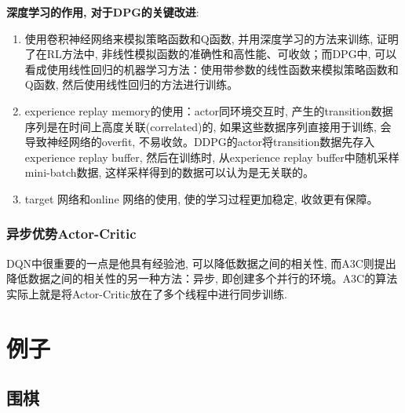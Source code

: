 \documentclass{article}
\begin{document}
            \textbf{深度学习的作用, 对于DPG的关键改进}:
            \begin{enumerate}
                \item 使用卷积神经网络来模拟策略函数和Q函数, 并用深度学习的方法来训练, 证明了在RL方法中, 非线性模拟函数的准确性和高性能、可收敛；而DPG中, 可以看成使用线性回归的机器学习方法：使用带参数的线性函数来模拟策略函数和Q函数, 然后使用线性回归的方法进行训练。
                \item experience replay memory的使用：actor同环境交互时, 产生的transition数据序列是在时间上高度关联(correlated)的, 如果这些数据序列直接用于训练, 会导致神经网络的overfit, 不易收敛。DDPG的actor将transition数据先存入experience replay buffer, 然后在训练时, 从experience replay buffer中随机采样mini-batch数据, 这样采样得到的数据可以认为是无关联的。
                \item target 网络和online 网络的使用,  使的学习过程更加稳定, 收敛更有保障。
            \end{enumerate}
            
        \subsubsection{异步优势Actor-Critic}
            DQN中很重要的一点是他具有经验池, 可以降低数据之间的相关性, 而A3C则提出降低数据之间的相关性的另一种方法：异步, 即创建多个并行的环境。A3C的算法实际上就是将Actor-Critic放在了多个线程中进行同步训练. 
        
\section{例子}
    \subsection{围棋}
\end{document}
